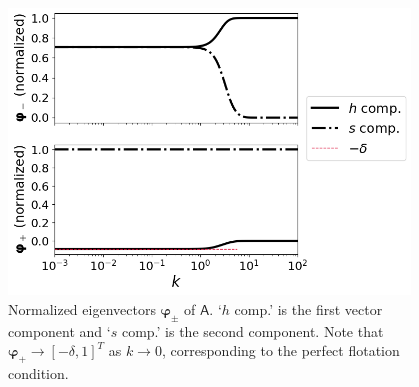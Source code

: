 \documentclass[paper=a4, fontsize=11pt]{article} %
\begin{document}
\begin{figure}
\centering
\includegraphics[width=0.95\textwidth]{figs/fig4.png}
\caption{Normalized eigenvectors $\pmb{\varphi}_\pm$ of $\mathsf{A}$. `$h$ comp.' is the first
vector component and `$s$ comp.' is the second component. Note that $\pmb{\varphi}_+\to[-\delta,1]^T$
as $k\to 0$, corresponding to the perfect flotation condition. }
\label{fig:eigvecs}
\end{figure}
\end{document}

